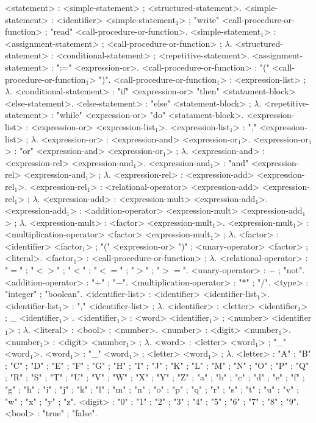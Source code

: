 \begin{grammar}
		<statement> : <simple-statement> ; <structured-statement>.
		<simple-statement> : <identifier> <simple-statement$_1$> ; "write" <call-procedure-or-function> ; "read" <call-procedure-or-function>.
        <simple-statement$_1$> : <assignment-statement> ; <call-procedure-or-function> ; $\lambda$.
		<structured-statement> : <conditional-statement> ; <repetitive-statement>.
		<assignment-statement> : ":=" <expression-or>.
        <call-procedure-or-function> : "(" <call-procedure-or-function$_1$> ")".
        <call-procedure-or-function$_1$> : <expression-list> ; $\lambda$.
		<conditional-statement> : "if" <expression-or> "then" <statament-block> <else-statement>.
        <else-statement> : "else" <statement-block> ; $\lambda$.
		<repetitive-statement> : "while" <expression-or> "do" <statament-block>.
		<expression-list> : <expression-or> <expression-list$_1$>.
        <expression-list$_1$> : "," <expression-list> ; $\lambda$.
        <expression-or> :  <expression-and> <expression-or$_1$>.
        <expression-or$_1$> : "or" <expression-and> <expression-or$_1$> ; $\lambda$.
		<expression-and> : <expression-rel> <expression-and$_1$>.
		<expression-and$_1$> : "and" <expression-rel> <expression-and$_1$> ; $\lambda$.
        <expression-rel> : <expression-add> <expression-rel$_1$>.
        <expression-rel$_1$> : <relational-operator> <expression-add> <expression-rel$_1$> ; $\lambda$.
		<expression-add> : <expression-mult> <expression-add$_1$>.
		<expression-add$_1$> : <addition-operator> <expression-mult> <expression-add$_1$> ; $\lambda$.
        <expression-mult> : <factor> <expression-mult$_1$>.
        <expression-mult$_1$> : <multiplication-operator> <factor> <expression-mult$_1$> ; $\lambda$.
		<factor> : <identifier> <factor$_1$> ; "(" <expression-or> ")" ; <unary-operator> <factor> ; <literal>.
        <factor$_1$> : <call-procedure-or-function> ; $\lambda$.
		<relational-operator> : "$=$" ; "$<>$" ; "$<$" ; "$<=$" ; "$>$" ; "$>=$".
        <unary-operator> : $-$ ; "not".
		<addition-operator> : "$+$" ; "$-$".
		<multiplication-operator> : "$*$" ; "$/$".
		<type> : "integer" ; "boolean".
		<identifier-list> : <identifier> <identifier-list$_1$>.
        <identifier-list$_1$> : "," <identifier-list> ; $\lambda$.
		<identifier> : <letter> <identifier$_1$> ; \_ <identifier$_1$> .
        <identifier$_1$> : <word> <identifier$_1$> ; <number> <identifier$_1$> ; $\lambda$.
		<literal> : <bool> ; <number>.
		<number> :  <digit> <number$_1$>.
		<number$_1$> : <digit> <number$_1$> ; $\lambda$.
        <word> : <letter> <word$_1$> ; "\_" <word$_1$>.
		<word$_1$> : "\_" <word$_1$> ; <letter> <word$_1$> ; $\lambda$.
		<letter> : "A" ; "B" ; "C" ; "D" ; "E" ; "F" ; "G" ; "H" ; "I" ; "J" ; "K" ; "L" ; "M" ; "N" ; "O" ; "P" ; "Q" ; "R" ; "S" ; "T" ; "U" ; "V" ; "W" ; "X" ; "Y" ; "Z" ; "a" ; "b" ; "c" ; "d" ; "e" ; "f" ; "g" ; "h" ; "i" ; "j" ; "k" ; "l" ; "m" ; "n" ; "o" ; "p" ; "q" ; "r" ; "s" ; "t" ; "u" ; "v" ; "w" ; "x" ; "y" ; "z".
		<digit> : "0" ; "1" ; "2" ; "3" ; "4" ; "5" ; "6" ; "7" ; "8" ; "9".
		<bool> : "true" ; "false".
\end{grammar}

